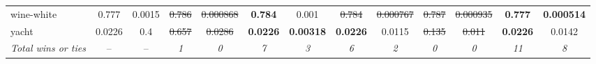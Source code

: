 \begin{tabular}{l|cc|cc|cc|cc|cc|cc}
wine-white & 0.777 & 0.0015 & \sout{0.786} & \sout{0.000868} & \textbf{0.784} & 0.001 & \sout{0.784} & \sout{0.000767} & \sout{0.787} & \sout{0.000935} & \textbf{0.777} & \textbf{0.000514} \\
yacht & 0.0226 & 0.4 & \sout{0.657} & \sout{0.0286} & \textbf{0.0226} & \textbf{0.00318} & \textbf{0.0226} & 0.0115 & \sout{0.135} & \sout{0.011} & \textbf{0.0226} & 0.0142 \\
\textit{{Total wins or ties}} & -- & -- & \textit{1} & \textit{0} & \textit{7} & \textit{3} & \textit{6} & \textit{2} & \textit{0} & \textit{0} & \textit{11} & \textit{8} \\
\bottomrule
\end{tabular}
